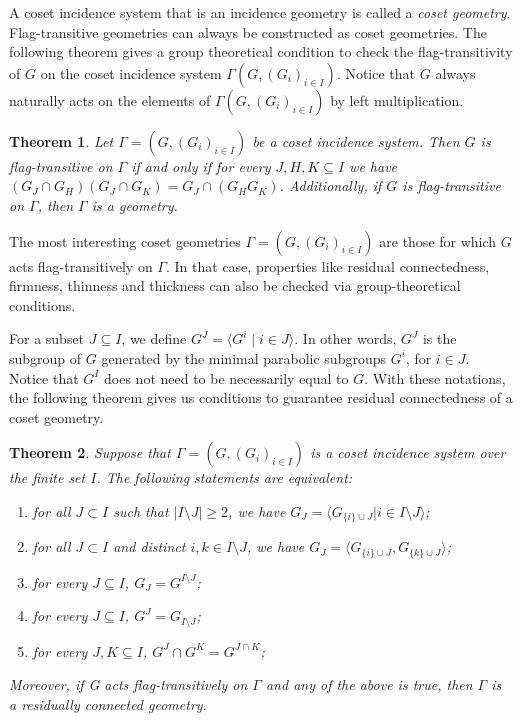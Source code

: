 \documentclass[11pt,letterpaper]{amsart}
\newtheorem{theorem}{Theorem}[section]
\begin{document}
A coset incidence system that is an incidence geometry is called a \emph{coset geometry}.
Flag-transitive geometries can always be constructed as coset geometries.
The following theorem gives a group theoretical condition to check the flag-transitivity of $G$ on the coset incidence system $\Gamma(G,(G_i)_{i\in I})$. Notice that $G$ always naturally acts on the elements of $\Gamma(G,(G_i)_{i \in I})$ by left multiplication.

\begin{theorem}\cite[Proposition 2.2, adapted]{Piedade2026}\label{thm:cosetFT}
Let $\Gamma = (G,(G_i)_{i\in I})$ be a coset incidence system. Then $G$ is flag-transitive on $\Gamma$ if and only if for every $J,H,K \subseteq I$ we have $(G_J \cap G_H )(G_J \cap G_K ) = G_J \cap (G_H G_K )$.
Additionally, if $G$ is flag-transitive on $\Gamma$, then $\Gamma$ is a geometry.
\end{theorem}


The most interesting coset geometries $\Gamma = (G,(G_i)_{i\in I})$ are those for which $G$ acts flag-transitively on $\Gamma$. In that case, properties like residual connectedness, firmness, thinness and thickness can also be checked via group-theoretical conditions.

For a subset $J\subseteq I$, we define $G^J=\langle G^i\mid i\in J\rangle$. In other words, $G^J$ is the subgroup of $G$ generated by the minimal parabolic subgroups $G^i$, for $i\in J$. Notice that $G^I$ does not need to be necessarily equal to $G$. With these notations, the following theorem gives us conditions to guarantee residual connectedness of a coset geometry.

\begin{theorem}\cite[Corollary 1.8.13]{buekenhout2013diagram}\cite[Proposition 1.8.12]{buekenhout2013diagram}\cite[Lemma 2.5]{Piedade2026}
\label{thm:CosetRC}
    Suppose that $\Gamma = (G,(G_i)_{i\in I})$ is a coset incidence system over
the finite set $I$. The following statements are equivalent:
\begin{enumerate}
        \item for all $J \subset I$ such that $|I \setminus J| \geq 2$, we have
        $G_J = \langle G_{\{i\} \cup J} | i \in I \setminus J \rangle$;\label{lem:RCequivs:itm:RC1}
        \item for all $J \subset I$ and distinct $i,k\in I\setminus J$, we have 
        $G_J = \langle G_{\{i\} \cup J} , G_{\{k\} \cup J} \rangle$; \label{lem:RCequivs:itm:RC2}
        \item for every $J\subseteq I$, $G_{J} = G^{I\setminus J}$;\label{lem:RCequivs:itm:BottomUp}
        \item for every $J\subseteq I$, $G^J = G_{I\setminus J}$;\label{lem:RCequivs:itm:UpBottom}
        \item for every $J,K\subseteq I$, $G^J\cap G^K = G^{J\cap K}$;\label{lem:RCequivs:itm:Intersection}
    \end{enumerate}
Moreover, if G acts flag-transitively on $\Gamma$ and any of the above is true, then $\Gamma$ is a residually connected geometry.
\end{theorem}
\end{document}
